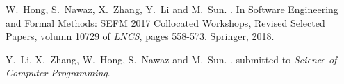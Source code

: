 \documentclass[preprint,3p]{elsarticle}
\begin{document}
\begin{thebibliography}{ 10}
W.~Hong, S.~Nawaz, X.~Zhang, Y.~Li and M.~Sun.
.
\newblock In {Software Engineering and Formal Methods: SEFM 2017 Collocated Workshops, Revised Selected Papers},
volumn 10729 of {\em {LNCS}},
 pages {558-573}. {Springer}, 2018.

Y.~Li, X.~Zhang, W.~Hong, S.~Nawaz and M.~Sun.
.
\newblock submitted to {\em Science of Computer Programming}.


\end{thebibliography}
\end{document}
